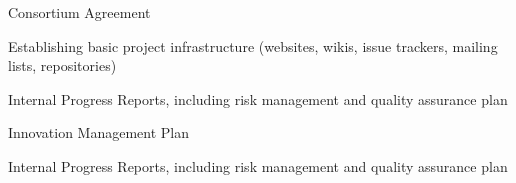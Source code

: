\begin{workpackage}
%


\begin{wpdelivs}
\begin{wpdeliv}[due=1,id=ca,dissem=CO,nature=R,lead=PS]{Consortium Agreement}
\end{wpdeliv}

\begin{wpdeliv}[due=1,id=tickets,dissem=PU,nature=DEC,lead=PS]{Establishing basic project infrastructure 
    (websites, wikis, issue trackers, mailing lists, repositories)}
\end{wpdeliv}

\begin{wpdeliv}[due=12,lead=PS,
id=ipr,dissem=CO,nature=R]{Internal Progress Reports, including risk management and quality assurance plan}
\end{wpdeliv}

\begin{wpdeliv}[due=18,lead=PS,
id=tickets,dissem=CO,nature=R]{Innovation Management Plan}
\end{wpdeliv}

\begin{wpdeliv}[due=36,lead=PS,
id=ipr,dissem=CO,nature=R]{Internal Progress Reports, including risk management and quality assurance plan}
\end{wpdeliv}


\end{wpdelivs}
\end{workpackage}
